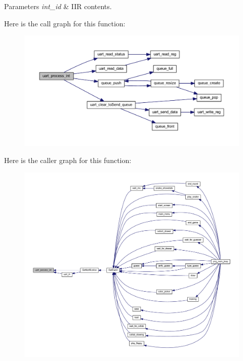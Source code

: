 \begin{DoxyParams}{Parameters}
{\em int\+\_\+id} & I\+IR contents. \\
\hline
\end{DoxyParams}
Here is the call graph for this function\+:\nopagebreak
\begin{figure}[H]
\begin{center}
\leavevmode
\includegraphics[width=350pt]{group__uart_ga1eb7fd21c4d53e035f6d522a81563ac2_cgraph}
\end{center}
\end{figure}
Here is the caller graph for this function\+:\nopagebreak
\begin{figure}[H]
\begin{center}
\leavevmode
\includegraphics[width=350pt]{group__uart_ga1eb7fd21c4d53e035f6d522a81563ac2_icgraph}
\end{center}
\end{figure}
\mbox{\label{group__uart_ga25bafed3ff787360a644c19f0e5acd26}} 
